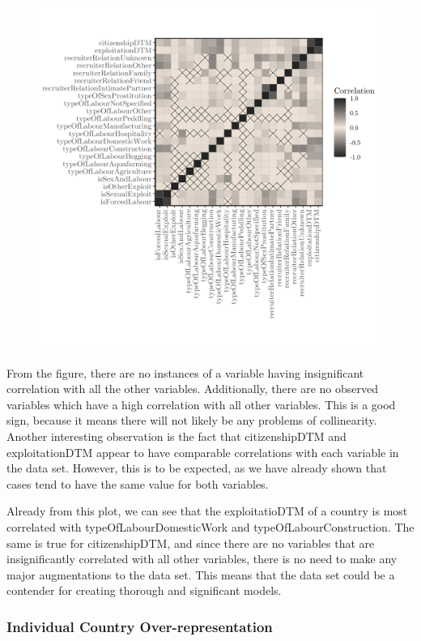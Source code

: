 \documentclass{article} %
\begin{document}
\FloatBarrier
\begin{figure}[H]
	\includegraphics[width = \textwidth]{CorrPlot}
\end{figure}
\FloatBarrier

From the figure, there are no instances of a variable having insignificant correlation with all the other variables. Additionally, there are no observed variables which have a high correlation with all other variables. This is a good sign, because it means there will not likely be any problems of collinearity. Another interesting observation is the fact that citizenshipDTM and exploitationDTM appear to have comparable correlations with each variable in the data set. However, this is to be expected, as we have already shown that cases tend to have the same value for both variables. 

Already from this plot, we can see that the exploitatioDTM of a country is most correlated with typeOfLabourDomesticWork and typeOfLabourConstruction. The same is true for citizenshipDTM, and since there are no variables that are insignificantly correlated with all other variables, there is no need to make any major augmentations to the data set. This means that the data set could be a contender for creating thorough and significant models.

\subsubsection{Individual Country Over-representation}
\end{document}
